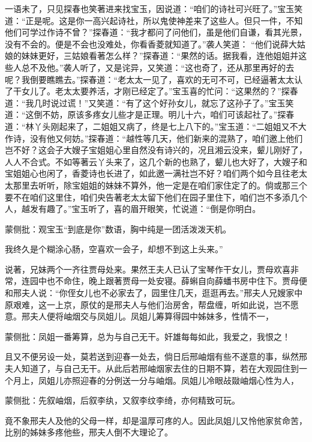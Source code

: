 \begin{parag}
    一语未了，只见探春也笑著进来找宝玉，因说道：“咱们的诗社可兴旺了。”宝玉笑道：“正是呢。这是你一高兴起诗社，所以鬼使神差来了这些人。但只一件，不知他们可学过作诗不曾？”探春道：“我才都问了问他们，虽是他们自谦，看其光景，没有不会的。便是不会也没难处，你看香菱就知道了。”袭人笑道： “他们说薛大姑娘的妹妹更好，三姑娘看著怎么样？”探春道：“果然的话。据我看，连他姐姐并这些人总不及他。”袭人听了，又是诧异，又笑道：“这也奇了，还从那里再好的去呢？我倒要瞧瞧去。”探春道：“老太太一见了，喜欢的无可不可，已经逼著太太认了干女儿了。老太太要养活，才刚已经定了。”宝玉喜的忙问：“这果然的？”探春道：“我几时说过谎！”又笑道：“有了这个好孙女儿，就忘了这孙子了。”宝玉笑道：“这倒不妨，原该多疼女儿些才是正理。明儿十六，咱们可该起社了。”探春道：“林丫头刚起来了，二姐姐又病了，终是七上八下的。”宝玉道：“二姐姐又不大作诗，没有他又何妨。”探春道：“越性等几天，他们新来的混熟了，咱们邀上他们岂不好？这会子大嫂子宝姐姐心里自然没有诗兴的，况且湘云没来，颦儿刚好了，人人不合式。不如等著云丫头来了，这几个新的也熟了，颦儿也大好了，大嫂子和宝姐姐心也闲了，香菱诗也长进了，如此邀一满社岂不好？咱们两个如今且往老太太那里去听听，除宝姐姐的妹妹不算外，他一定是在咱们家住定了的。倘或那三个要不在咱们这里住，咱们央告著老太太留下他们在园子里住下，咱们岂不多添几个人，越发有趣了。”宝玉听了，喜的眉开眼笑，忙说道：“倒是你明白。\begin{note}蒙侧批：观宝玉“到底是你”数语，胸中纯是一团活泼泼天机。\end{note}我终久是个糊涂心肠，空喜欢一会子，却想不到这上头来。”
\end{parag}


\begin{parag}
    说著，兄妹两个一齐往贾母处来。果然王夫人已认了宝琴作干女儿，贾母欢喜非常，连园中也不命住，晚上跟著贾母一处安寝。薛蝌自向薛蟠书房中住下。贾母便和邢夫人说：“你侄女儿也不必家去了，园里住几天，逛逛再去。”邢夫人兄嫂家中原艰难，这一上京，原仗的是邢夫人与他们治房舍，帮盘缠，听如此说，岂不愿意。邢夫人便将岫烟交与凤姐儿。凤姐儿筹算得园中姊妹多，性情不一，\begin{note}蒙侧批：凤姐一番筹算，总为与自己无干。奸雄每每如此，我爱之，我恨之！\end{note}且又不便另设一处，莫若送到迎春一处去，倘日后邢岫烟有些不遂意的事，纵然邢夫人知道了，与自己无干。从此后若邢岫烟家去住的日期不算，若在大观园住到一个月上，凤姐儿亦照迎春的分例送一分与岫烟。凤姐儿冷眼敁敠岫烟心性为人，\begin{note}蒙侧批：先叙岫烟，后叙李纨，又叙李纹李绮，亦何精致可玩。\end{note}竟不象邢夫人及他的父母一样，却是温厚可疼的人。因此凤姐儿又怜他家贫命苦，比别的姊妹多疼他些，邢夫人倒不大理论了。
\end{parag}


